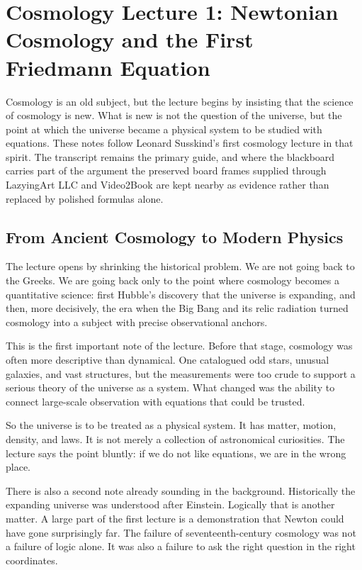 \chapter{Cosmology Lecture 1: Newtonian Cosmology and the First Friedmann Equation}

Cosmology is an old subject, but the lecture begins by insisting that the science of cosmology is new. What is new is not the question of the universe, but the point at which the universe became a physical system to be studied with equations. These notes follow Leonard Susskind's first cosmology lecture in that spirit. The transcript remains the primary guide, and where the blackboard carries part of the argument the preserved board frames supplied through LazyingArt LLC and Video2Book are kept nearby as evidence rather than replaced by polished formulas alone.

\section{From Ancient Cosmology to Modern Physics}

The lecture opens by shrinking the historical problem. We are not going back to the Greeks. We are going back only to the point where cosmology becomes a quantitative science: first Hubble's discovery that the universe is expanding, and then, more decisively, the era when the Big Bang and its relic radiation turned cosmology into a subject with precise observational anchors.

This is the first important note of the lecture. Before that stage, cosmology was often more descriptive than dynamical. One catalogued odd stars, unusual galaxies, and vast structures, but the measurements were too crude to support a serious theory of the universe as a system. What changed was the ability to connect large-scale observation with equations that could be trusted.

So the universe is to be treated as a physical system. It has matter, motion, density, and laws. It is not merely a collection of astronomical curiosities. The lecture says the point bluntly: if we do not like equations, we are in the wrong place.

There is also a second note already sounding in the background. Historically the expanding universe was understood after Einstein. Logically that is another matter. A large part of the first lecture is a demonstration that Newton could have gone surprisingly far. The failure of seventeenth-century cosmology was not a failure of logic alone. It was also a failure to ask the right question in the right coordinates.

